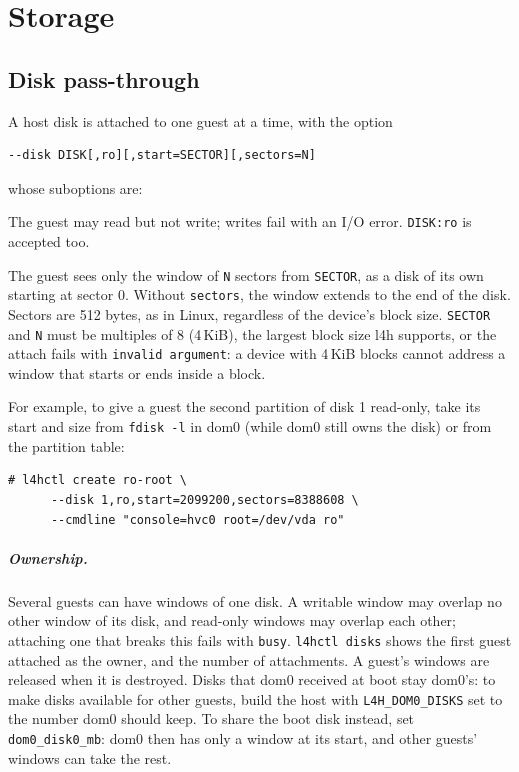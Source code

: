 \documentclass[11pt,a4paper]{report}
\newcommand{\cmd}[1]{\texttt{#1}}
\begin{document}
\chapter{Storage}
\label{ch:storage}

\section{Disk pass-through}

A host disk is attached to one guest at a time, with the option
\begin{lstlisting}
--disk DISK[,ro][,start=SECTOR][,sectors=N]
\end{lstlisting}
whose suboptions are:

\begin{description}[style=nextline]
  \item[\texttt{ro}] The guest may read but not write; writes fail with an
    I/O error. \texttt{DISK:ro} is accepted too.
  \item[\texttt{start=SECTOR}, \texttt{sectors=N}] The guest sees only the
    window of \texttt{N} sectors from \texttt{SECTOR}, as a disk of its own
    starting at sector 0. Without \texttt{sectors}, the window extends to the
    end of the disk. Sectors are 512 bytes, as in Linux, regardless of the
    device's block size. \texttt{SECTOR} and \texttt{N} must be multiples
    of 8 (4\,KiB), the largest block size l4h supports, or the attach fails
    with \texttt{invalid argument}: a device with 4\,KiB blocks cannot
    address a window that starts or ends inside a block.
\end{description}

For example, to give a guest the second partition of disk 1 read-only, take
its start and size from \cmd{fdisk -l} in dom0 (while dom0 still owns the
disk) or from the partition table:
\begin{lstlisting}
# l4hctl create ro-root \
      --disk 1,ro,start=2099200,sectors=8388608 \
      --cmdline "console=hvc0 root=/dev/vda ro"
\end{lstlisting}

\paragraph{Ownership.} Several guests can have windows of one disk. A
writable window may overlap no other window of its disk, and read-only
windows may overlap each other; attaching one that breaks this fails with
\texttt{busy}. \cmd{l4hctl disks} shows the first guest attached as the
owner, and the number of attachments. A guest's windows are released when it
is destroyed. Disks that dom0 received at boot stay dom0's: to make
disks available for other guests, build the host with
\texttt{L4H\_DOM0\_DISKS} set to the number dom0 should keep. To share the
boot disk instead, set \texttt{dom0\_disk0\_mb}: dom0 then has only a window
at its start, and other guests' windows can take the rest.
\end{document}
